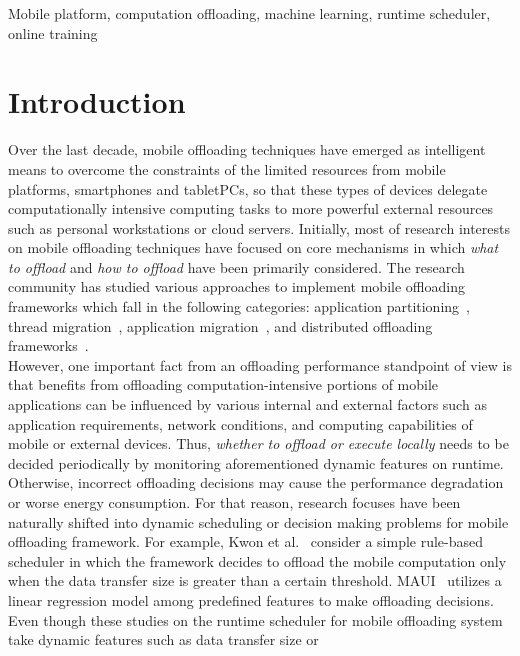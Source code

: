 \documentclass[10pt, conference, compsocconf]{IEEEtran}
\begin{document}
\begin{IEEEkeywords}
Mobile platform, computation offloading, machine learning, runtime
scheduler, online training
\end{IEEEkeywords}

\section{Introduction}
%
Over the last decade, mobile offloading techniques have emerged as
intelligent means to overcome the constraints of the limited resources
from mobile platforms, smartphones and tabletPCs, so that these types of
devices delegate computationally intensive computing tasks to more
powerful external resources such as personal workstations or cloud
servers.
%
Initially, most of research interests on mobile offloading techniques
have focused on core mechanisms in which \textit{what to offload} and
\textit{how to offload} have been primarily considered. 
%
The research community has studied various approaches to implement mobile
offloading frameworks which fall in the following categories:
application partitioning~\cite{spectra, maui, cuckoo}, thread
migration~\cite{clonecloud, comet}, application migration~\cite{hung},
and distributed offloading frameworks~\cite{mmr, sonora, serendipity}.\\
%
\indent However, one important fact from an offloading performance
standpoint of view is that benefits from offloading
computation-intensive portions of mobile applications can be influenced
by various internal and external factors such as application
requirements, network conditions, and computing capabilities of mobile
or external devices.
%
Thus, \textit{whether to offload or execute locally} needs to be
decided periodically by monitoring aforementioned dynamic features on
runtime.
%
Otherwise, incorrect offloading decisions may cause the performance
degradation or worse energy consumption.
%
For that reason, research focuses have been naturally shifted into
dynamic scheduling or decision making problems for mobile offloading
framework.
%
For example, Kwon et al.~\cite{kwon} consider a simple rule-based
scheduler in which the framework decides to offload the mobile
computation only when the data transfer size is greater than a certain
threshold.
%
MAUI~\cite{maui} utilizes a linear regression model among predefined
features to make offloading decisions.\\
%
\indent Even though these studies on the runtime scheduler for mobile
offloading system take dynamic features such as data transfer size or
\end{document}
